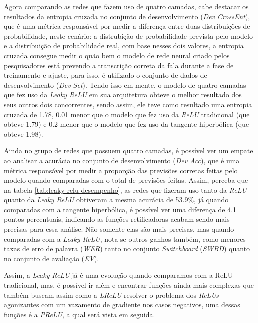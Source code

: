 \begin{table}[ht]
\begin{threeparttable}
    \end{threeparttable}
\end{table}

Agora comparando as redes que fazem uso de quatro camadas, cabe destacar os resultados da entropia cruzada no conjunto de desenvolvimento (\textit{Dev CrossEnt}), que é uma métrica responsável por medir a diferença entre duas distribuições de probabilidade, neste cenário: a distrubição de probabilidade prevista pelo modelo e a distribuição de probabilidade real, com base nesses dois valores, a entropia cruzada consegue medir o quão bem o modelo de rede neural criado pelos pesquisadores está prevendo a transcrição correta da fala durante a fase de treinamento e ajuste, para isso, é utilizado o conjunto de dados de desenvolvimento (\textit{Dev Set}). Tendo isso em mente, o modelo de quatro camadas que fez uso da \textit{Leaky ReLU} em sua arquitetura obteve o melhor resultado dos seus outros dois concorrentes, sendo assim, ele teve como resultado uma entropia cruzada de 1.78, 0.01 menor que o modelo que fez uso da \textit{ReLU} tradicional (que obteve 1.79) e 0.2 menor que o modelo que fez uso da tangente hiperbólica (que obteve 1.98).

Ainda no grupo de redes que possuem quatro camadas, é possível ver um empate ao analisar a acurácia no conjunto de desenvolvimento (\textit{Dev Acc}), que é uma métrica responsável por medir a proporção das previsões corretas feitas pelo modelo quando comparadas com o total de previsões feitas. Assim, perceba que na tabela \ref{tab:leaky-relu-desempenho}, as redes que fizeram uso tanto da \textit{ReLU} quanto da \textit{Leaky ReLU} obtiveram a mesma acurácia de 53.9\%, já quando comparadas com a tangente hiperbólica, é possível ver uma diferença de 4.1 pontos percentuais, indicando as funções retificadoras acabam sendo mais precisas para essa análise. Não somente elas são mais precisas, mas quando comparadas com a \textit{Leaky ReLU}, nota-se outros ganhos também, como menores taxas de erro de palavra (\textit{WER}) tanto no conjunto \textit{Switchboard} (\textit{SWBD}) quanto no conjunto de avaliação (\textit{EV}).

Assim, a \textit{Leaky ReLU} já é uma evolução quando comparamos com a ReLU tradicional, mas, é possível ir além e encontrar funções ainda mais complexas que também buscam assim como a \textit{LReLU} resolver o problema dos \textit{ReLUs} agonizantes com um vazamento de gradiente nos casos negativos, uma dessas funções é a \textit{PReLU}, a qual será vista em seguida.

